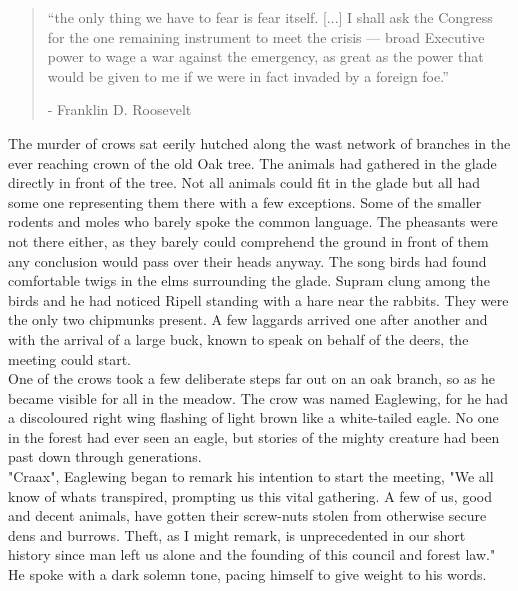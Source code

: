 \documentclass[smalldemyvopaper,11pt,twoside,onecolumn,openright,extrafontsizes]{memoir}
\begin{document}
\vspace{-1.3cm}
\begin{localsize}{10}
	\begin{quote}
		“the only thing we have to fear is fear itself. [...] I shall ask the Congress for the one remaining instrument to meet the crisis — broad Executive power to wage a war against the emergency, as great as the power that would be given to me if we were in fact invaded by a foreign foe.”
		\begin{flushright}- Franklin D. Roosevelt \end{flushright}
	\end{quote} 
\end{localsize}
\vspace{1cm}

The murder of crows sat eerily hutched along the wast network of branches in the ever reaching crown of the old Oak tree. The animals had gathered in the glade directly in front of the tree. Not all animals could fit in the glade but all had some one representing them there with a few exceptions. Some of the smaller rodents and moles who barely spoke the common language. The pheasants were not there either, as they barely could comprehend the ground in front of them any conclusion would pass over their heads anyway. The song birds had found comfortable twigs in the elms surrounding the glade. Supram clung among the birds and he had noticed Ripell standing with a hare near the rabbits. They were the only two chipmunks present. A few laggards arrived one after another and with the arrival of a large buck, known to speak on behalf of the deers, the meeting could start. \\

One of the crows took a few deliberate steps far out on an oak branch, so as he became visible for all in the meadow. The crow was named Eaglewing, for he had a discoloured right wing flashing of light brown like a white-tailed eagle. No one in the forest had ever seen an eagle, but stories of the mighty creature had been past down through generations.\\

"Craax", Eaglewing began to remark his intention to start the meeting, "We all know of whats transpired, prompting us this vital gathering. A few of us, good and decent animals, have gotten their screw-nuts stolen from otherwise secure dens and burrows. Theft, as I might remark, is unprecedented in our short history since man left us alone and the founding of this council and forest law." He spoke with a dark solemn tone, pacing himself to give weight to his words.
\end{document}
